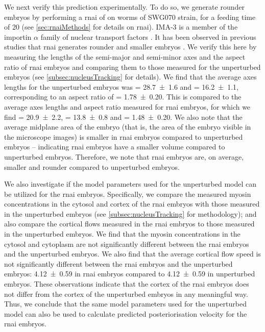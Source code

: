 We next verify this prediction experimentally. To do so, we generate rounder embryos by performing a \ac{rnai} of  on worms of SWG070 strain, for a feeding time of \SI{20}{\unitRNAiTime} (see \autoref{sec:rnaiMethods} for details on \ac{rnai}). IMA-3 is a member of the importin $\alpha$ family of nuclear transport factors \citep{geles2001germline,sonnichsen2005full}. It has been observed in previous studies that  \ac{rnai} generates rounder and smaller embryos \citep{sonnichsen2005full}. We verify this here by measuring the lengths of the semi-major \longAxisLength and semi-minor \shortAxisLength axes and the aspect ratio of  \ac{rnai} embryos and comparing them to those measured for the unperturbed embryos (see \autoref{subsec:nucleusTracking} for details). We find that the average axes lengths for the unperturbed embryos was \longAxisLength = \SI{28.7 +- 1.6}{\unitLength} and \shortAxisLength = \SI{16.2 +- 1.1}{\unitLength}, corresponding to an aspect ratio of \aspectRatio = \num{1.78 +- 0.20}. This is compared to the average axes lengths and aspect ratio measured for  \ac{rnai} embryos, for which we find \longAxisLength = \SI{20.9 +- 2.2}{\unitLength}, \shortAxisLength = \SI{13.8 +- 0.8}{\unitLength} and \aspectRatio = \num{1.48 +- 0.20}. We also note that the average midplane area of the embryo (that is, the area of the embryo visible in the microscope images) is smaller in  \ac{rnai} embryos compared to unperturbed embryos -- indicating  \ac{rnai} embryos have a smaller volume compared to unperturbed embryos. Therefore, we note that  \ac{rnai} embryos are, on average, smaller and rounder compared to unperturbed embryos.

We also investigate if the model parameters used for the unperturbed model can be utilized for the \ac{rnai} embryos. Specifically, we compare the measured myosin concentrations in the cytosol and cortex of the \ac{rnai} embryos with those measured in the unperturbed embryos (see \autoref{subsec:nucleusTracking} for methodology); and also compare the cortical flows measured in the \ac{rnai} embryos to those measured in the unperturbed embryos. We find that the myosin concentrations in the cytosol and cytoplasm are not significantly different between the \ac{rnai} embryos and the unperturbed embryos. We also find that the average cortical flow speed is not significantly different between the \ac{rnai} embryos and the unperturbed embryos: \SI{4.12 +- 0.59}{\unitCrtxVel} in \ac{rnai} embryos compared to \SI{4.12 +- 0.59}{\unitCrtxVel} in unperturbed embryos. These observations indicate that the cortex of the \ac{rnai} embryos does not differ from the cortex of the unperturbed embryos in any meaningful way. Thus, we conclude that the same model parameters used for the unperturbed model can also be used to calculate predicted posteriorisation velocity for the  \ac{rnai} embryos.

